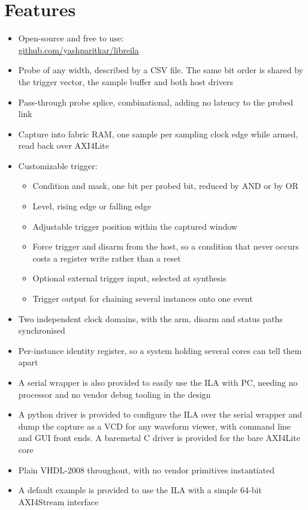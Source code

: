 \documentclass[twocolumn]{article}
\begin{document}
\section{Features}
\begin{itemize}
    \item Open-source and free to use: \\ \url{github.com/yashparitkar/libreila}
    \item Probe of any width, described by a CSV file. The same bit order is shared by the trigger vector, the sample buffer and both host drivers
    \item Pass-through probe splice, combinational, adding no latency to the probed link
    \item Capture into fabric RAM, one sample per sampling clock edge while armed, read back over AXI4Lite
    \item Customizable trigger:
    \begin{itemize}
        \item Condition and mask, one bit per probed bit, reduced by AND or by OR
        \item Level, rising edge or falling edge
        \item Adjustable trigger position within the captured window
        \item Force trigger and disarm from the host, so a condition that never occurs costs a register write rather than a reset
        \item Optional external trigger input, selected at synthesis
        \item Trigger output for chaining several instances onto one event
    \end{itemize}
    \item Two independent clock domains, with the arm, disarm and status paths synchronised
    \item Per-instance identity register, so a system holding several cores can tell them apart
    \item A serial wrapper is also provided to easily use the \acs{ILA} with PC, needing no processor and no vendor debug tooling in the design
    \item A python driver is provided to configure the \acs{ILA} over the serial wrapper and dump the capture as a \acs{VCD} for any waveform viewer, with command line and \acs{GUI} front ends. A baremetal C driver is provided for the bare AXI4Lite core
    \item Plain VHDL-2008 throughout, with no vendor primitives instantiated
    \item A default example is provided to use the \acs{ILA} with a simple 64-bit AXI4Stream interface
\end{itemize}
\end{document}
